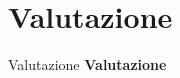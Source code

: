 \section{Valutazione}
\begin{frame}{Valutazione}
	\centering
	\textbf{\Huge{Valutazione}}
\end{frame}


